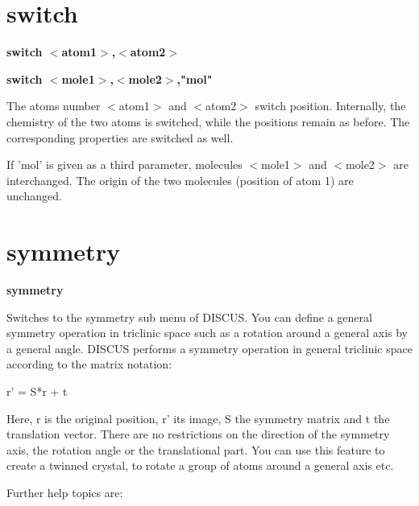 \section{switch}
{\bf switch $ <$atom1$> $,$ <$atom2$> $ \par }
{\bf switch $ <$mole1$> $,$ <$mole2$> $,"mol" \par }
\par
\vspace{3pt}
The atoms number $ <$atom1$> $ and $ <$atom2$> $ switch position. Internally, the 
chemistry of the two atoms is switched, while the positions remain 
as before. 
The corresponding properties are switched as well. 
\par
If 'mol' is given as a third parameter, molecules $ <$mole1$> $ and $ <$mole2$> $ 
are interchanged. The origin of the two molecules (position of atom 1) 
are unchanged. 
\section{symmetry}
{\bf symmetry \par }
\par
\vspace{3pt}
Switches to the symmetry sub menu of DISCUS. You can define a general 
symmetry operation in triclinic space such as a rotation around a 
general axis by a general angle. DISCUS performs a symmetry operation 
in general triclinic space according to the matrix notation: 
\par
\begin{MacVerbatim}
r' = S*r + t
\end{MacVerbatim}
Here, r is the original position, r' its image, S the symmetry matrix 
and t the translation vector.  There are no restrictions on the direction 
of the symmetry axis, the rotation angle or the translational part. 
You can use this feature to create a twinned crystal, to rotate a group 
of atoms around a general axis etc. 
\par
Further help topics are: 
\par

